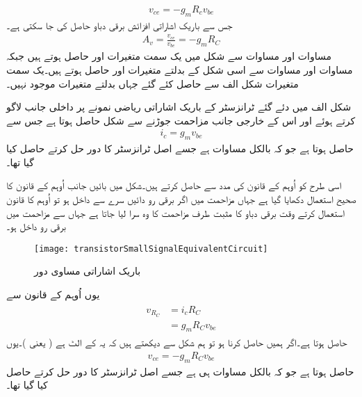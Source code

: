 \begin{align} \label{مساوات_ٹرانزسٹر_اشارہ_موجود_لہذا_بدلتا_دباو}
v_{ce}=- g_m R_c v_{be}
\end{align}
جس سے باریک اشاراتی افزائش برقی دباو  حاصل کی جا سکتی ہے۔
\begin{align}
A_v = \frac{v_{ce}}{v_{be}}=-g_m R_C
\end{align}
	مساوات   اور مساوات  سے شکل   میں یک سمت متغیرات  اور  حاصل ہوتے ہیں جبکہ مساوات   اور مساوات   سے اسی شکل کے بدلتے متغیرات  اور  حاصل ہوتے ہیں۔یک سمت متغیرات شکل  الف   سے حاصل کئے گئے جہاں بدلتے متغیرات موجود نہیں۔

شکل  الف میں دئے گئے ٹرانزسٹر کے باریک اشاراتی ریاضی نمونے  پر داخلی جانب  لاگو کرتے ہوئے اور اس کے خارجی جانب مزاحمت  جوڑنے سے شکل   حاصل ہوتا ہے جس سے
\begin{align}
i_c = g_m v_{be}
\end{align}
حاصل ہوتا ہے جو کہ بالکل مساوات   ہے جسے اصل ٹرانزسٹر کا دور حل کرتے حاصل کیا گیا تھا۔

اسی طرح  کو  اُوہم کے قانون کی مدد سے حاصل کرتے ہیں۔شکل میں بائیں جانب  اُوہم کے قانون کا صحیح استعمال دکھایا گیا ہے جہاں مزاحمت   میں اگر برقی رو  دائیں سرے سے داخل ہو تو  اُوہم کا قانون استعمال کرتے وقت برقی دباو  کا مثبت طرف مزاحمت کا وہ سرا لیا جاتا ہے جہاں سے مزاحمت میں برقی رو داخل ہو۔
\begin{figure}
\centering
\texttt{[image: transistorSmallSignalEquivalentCircuit]}
\caption{باریک اشاراتی مساوی دور}
\label{شکل_باریک_اشاراتی_مساوی_دور}
\end{figure}
یوں  اُوہم کے قانون سے
\begin{gather}
\begin{aligned}
v_{R_C}&=i_c R_C\\
&=g_m R_C v_{be}
\end{aligned}
\end{gather}
حاصل ہوتا ہے۔اگر ہمیں  حاصل کرنا ہو تو ہم شکل سے دیکھتے ہیں کہ یہ  کے الٹ ہے ( یعنی )۔یوں
\begin{align}
v_{ce}=-g_m R_C v_{be}
\end{align}
حاصل ہوتا ہے جو کہ بالکل مساوات  ہی ہے جسے اصل ٹرانزسٹر کا دور حل کرتے حاصل کیا گیا تھا۔

